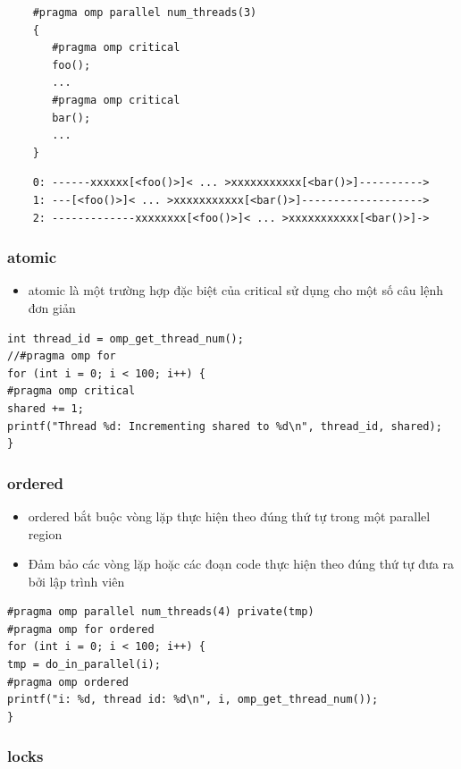 \documentclass[14pt, a4paper]{article}
\numberwithin{equation}{section}
\numberwithin{figure}{section}
\numberwithin{dl}{section}
\numberwithin{md}{section}
\numberwithin{bd}{section}
\numberwithin{dn}{section}
\numberwithin{hq}{section}
\begin{document}
\begin{verbatim}
    #pragma omp parallel num_threads(3)
    {
       #pragma omp critical
       foo();
       ...
       #pragma omp critical
       bar();
       ...
    }
        \end{verbatim}
    
        \begin{verbatim}
    0: ------xxxxxx[<foo()>]< ... >xxxxxxxxxxx[<bar()>]---------->
    1: ---[<foo()>]< ... >xxxxxxxxxxx[<bar()>]------------------->
    2: -------------xxxxxxxx[<foo()>]< ... >xxxxxxxxxxx[<bar()>]->
\end{verbatim}

\subsubsection{atomic}

\begin{itemize}
    \item atomic là một trường hợp đặc biệt của critical sử dụng cho một số câu lệnh đơn giản
\end{itemize}

\begin{verbatim}
int thread_id = omp_get_thread_num();
//#pragma omp for
for (int i = 0; i < 100; i++) {
#pragma omp critical
shared += 1;
printf("Thread %d: Incrementing shared to %d\n", thread_id, shared);
}
\end{verbatim}

\subsubsection{ordered}

\begin{itemize}
    \item ordered bắt buộc vòng lặp thực hiện theo đúng thứ tự trong một parallel region
    \item Đảm bảo các vòng lặp hoặc các đoạn code thực hiện theo đúng thứ tự đưa ra bởi lập trình viên
\end{itemize}
\begin{verbatim}
#pragma omp parallel num_threads(4) private(tmp)
#pragma omp for ordered
for (int i = 0; i < 100; i++) {
tmp = do_in_parallel(i);
#pragma omp ordered
printf("i: %d, thread id: %d\n", i, omp_get_thread_num());
}
\end{verbatim}

\subsubsection{locks}
\end{document}
